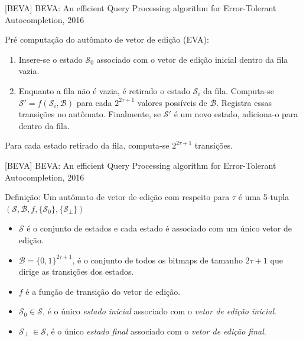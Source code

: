 \documentclass[11pt]{beamer}
\begin{document}
\begin{frame}{[BEVA] BEVA: An efficient Query Processing algorithm for Error-Tolerant Autocompletion, 2016}

    Pré computação do autômato de vetor de edição (EVA):
    
    \begin{enumerate}
        \item Insere-se o estado $\mathcal{S}_0$ associado com o vetor de edição inicial dentro da fila vazia.
        \item Enquanto a fila não é vazia, é retirado o estado $\mathcal{S}_i$ da fila. Computa-se $\mathcal{S'} = f(\mathcal{S}_i, \mathcal{B})$ para cada $2^{2 \tau +1}$ valores possíveis de $\mathcal{B}$. Registra essas transições no autômato. Finalmente, se $\mathcal{S'}$ é um novo estado, adiciona-o para dentro da fila.
    \end{enumerate}
    
    Para cada estado retirado da fila, computa-se $2^{2 \tau +1}$ transições.
   
\end{frame}

\begin{frame}{[BEVA] BEVA: An efficient Query Processing algorithm for Error-Tolerant Autocompletion, 2016}

    Definição: Um autômato de vetor de edição com respeito para $\tau$ é uma 5-tupla $(\mathcal{S}, \mathcal{B}, f, \{\mathcal{S}_0\}, \{\mathcal{S}_\perp\})$ \pause

    \begin{itemize}
        \item $\mathcal{S}$ é o conjunto de estados e cada estado é associado com um único vetor de edição.
        \item $\mathcal{B} = \{0, 1\}^{2\tau + 1}$, é o conjunto de todos os bitmaps de tamanho $2\tau + 1$ que dirige as transições dos estados.
        \item $f$ é a função de transição do vetor de edição.
        \item $\mathcal{S}_0 \in \mathcal{S}$, é o único \textit{estado inicial} associado com o \textit{vetor de edição inicial}.
        \item $\mathcal{S}_\perp\ \in \mathcal{S}$, é o único \textit{estado final} associado com o \textit{vetor de edição final}.
    \end{itemize}
    
   
\end{frame}
\end{document}
